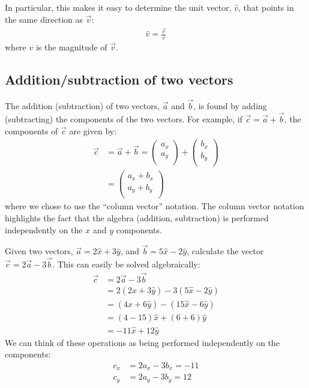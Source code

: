 In particular, this makes it easy to determine the unit vector, $\hat v$, that points in the same direction as $\vec v$:
\begin{align*}
\hat v = \frac{\vec v}{v}
\end{align*}
where $v$ is the magnitude of $\vec v$. 

\subsection{Addition/subtraction of two vectors}
The addition (subtraction) of two vectors, $\vec a$ and $\vec b$, is found by adding (subtracting) the components of the two vectors. For example, if $\vec c=\vec a+\vec b$, the components of $\vec c$ are given by:
\begin{align*}
\vec c &= \vec a + \vec b = \begin{pmatrix}
           a_x \\
           a_y \\
         \end{pmatrix} + \begin{pmatrix}
           b_x \\
           b_y \\
         \end{pmatrix}\\
         &=\begin{pmatrix}
           a_x+b_x \\
           a_y+b_y \\
         \end{pmatrix}
\end{align*}
where we chose to use the ``column vector'' notation. The column vector notation highlights the fact that the algebra (addition, subtraction) is performed independently on the $x$ and $y$ components. 
\begin{example}{Given two vectors, $\vec a=2\hat x+3\hat y$, and $\vec b=5\hat x-2\hat y$, calculate the vector $\vec c= 2\vec a- 3\vec b$.}
This can easily be solved algebraically:
\begin{align*}
\vec c &= 2\vec a- 3\vec b\\
&=2 (2\hat x+3\hat y) - 3 (5\hat x-2\hat y) \\
&=(4\hat x+6\hat y)-(15\hat x-6\hat y) \\
&=(4-15)\hat x + (6+6) \hat y\\
&= -11 \hat x + 12 \hat y
\end{align*}
We can think of these operations as being performed independently on the components:
\begin{align*}
c_x&=2a_x-3b_x=-11\\
c_y&=2a_y-3b_y=12
\end{align*} 
\end{example}

